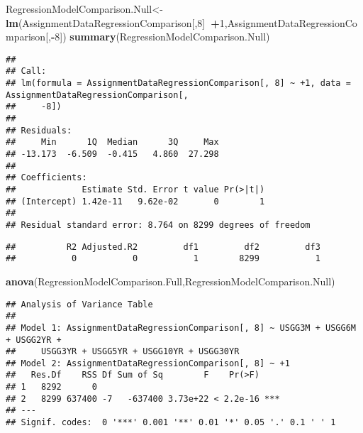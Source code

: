 \documentclass[]{article}
\newenvironment{Shaded}{\begin{snugshade}}{\end{snugshade}}
\newcommand{\KeywordTok}[1]{\textcolor[rgb]{0.13,0.29,0.53}{\textbf{#1}}}
\newcommand{\DataTypeTok}[1]{\textcolor[rgb]{0.13,0.29,0.53}{#1}}
\newcommand{\DecValTok}[1]{\textcolor[rgb]{0.00,0.00,0.81}{#1}}
\newcommand{\OperatorTok}[1]{\textcolor[rgb]{0.81,0.36,0.00}{\textbf{#1}}}
\newcommand{\NormalTok}[1]{#1}
\begin{document}
\begin{Shaded}
\begin{Highlighting}[]
\NormalTok{RegressionModelComparison.Null<-}\KeywordTok{lm}\NormalTok{(AssignmentDataRegressionComparison[,}\DecValTok{8}\NormalTok{]}\OperatorTok{~+}\DecValTok{1}\NormalTok{,AssignmentDataRegressionComparison[,}\OperatorTok{-}\DecValTok{8}\NormalTok{])}
\KeywordTok{summary}\NormalTok{(RegressionModelComparison.Null)}
\end{Highlighting}
\end{Shaded}

\begin{verbatim}
## 
## Call:
## lm(formula = AssignmentDataRegressionComparison[, 8] ~ +1, data = AssignmentDataRegressionComparison[, 
##     -8])
## 
## Residuals:
##     Min      1Q  Median      3Q     Max 
## -13.173  -6.509  -0.415   4.860  27.298 
## 
## Coefficients:
##             Estimate Std. Error t value Pr(>|t|)
## (Intercept) 1.42e-11   9.62e-02       0        1
## 
## Residual standard error: 8.764 on 8299 degrees of freedom
\end{verbatim}

\begin{Shaded}
\end{Shaded}

\begin{verbatim}
##          R2 Adjusted.R2         df1         df2         df3 
##           0           0           1        8299           1
\end{verbatim}

\begin{Shaded}
\begin{Highlighting}[]
\KeywordTok{anova}\NormalTok{(RegressionModelComparison.Full,RegressionModelComparison.Null)}
\end{Highlighting}
\end{Shaded}

\begin{verbatim}
## Analysis of Variance Table
## 
## Model 1: AssignmentDataRegressionComparison[, 8] ~ USGG3M + USGG6M + USGG2YR + 
##     USGG3YR + USGG5YR + USGG10YR + USGG30YR
## Model 2: AssignmentDataRegressionComparison[, 8] ~ +1
##   Res.Df    RSS Df Sum of Sq        F    Pr(>F)    
## 1   8292      0                                    
## 2   8299 637400 -7   -637400 3.73e+22 < 2.2e-16 ***
## ---
## Signif. codes:  0 '***' 0.001 '**' 0.01 '*' 0.05 '.' 0.1 ' ' 1
\end{verbatim}
\end{document}
